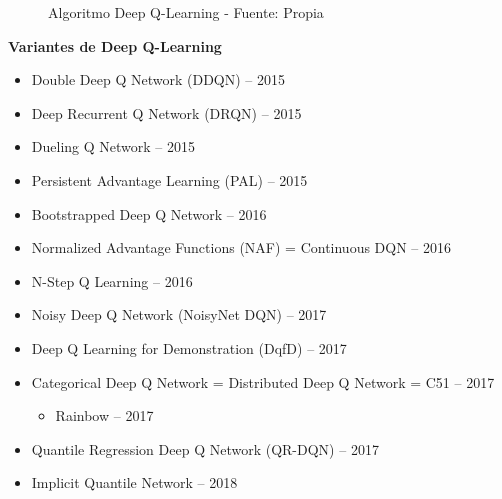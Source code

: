 \documentclass[
  a4paper,
  DIV=11,
  numbers=noendperiod]{scrreprt}
\providecommand{\tightlist}{%
  \setlength{\itemsep}{0pt}\setlength{\parskip}{0pt}}\usepackage{longtable,booktabs,array}
\begin{document}
\begin{figure}


\caption{\label{fig-rl_algoritmo_dqn}Algoritmo Deep Q-Learning - Fuente:
Propia}

\end{figure}%

\textbf{Variantes de Deep Q-Learning}

\begin{itemize}
\tightlist
\item
  Double Deep Q Network (DDQN) -- 2015
\item
  Deep Recurrent Q Network (DRQN) -- 2015
\item
  Dueling Q Network -- 2015
\item
  Persistent Advantage Learning (PAL) -- 2015
\item
  Bootstrapped Deep Q Network -- 2016
\item
  Normalized Advantage Functions (NAF) = Continuous DQN -- 2016
\item
  N-Step Q Learning -- 2016
\item
  Noisy Deep Q Network (NoisyNet DQN) -- 2017
\item
  Deep Q Learning for Demonstration (DqfD) -- 2017
\item
  Categorical Deep Q Network = Distributed Deep Q Network = C51 -- 2017

  \begin{itemize}
  \tightlist
  \item
    Rainbow -- 2017
  \end{itemize}
\item
  Quantile Regression Deep Q Network (QR-DQN) -- 2017
\item
  Implicit Quantile Network -- 2018
\end{itemize}
\end{document}
